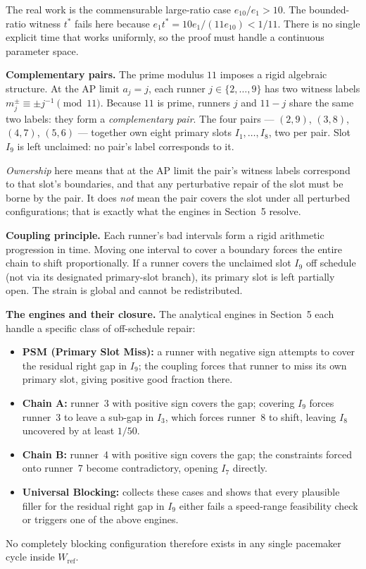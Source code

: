 \documentclass[12pt,a4paper]{amsart}
\theoremstyle{definition}
\theoremstyle{remark}
\newcommand{\Wref}{W_{\mathrm{ref}}}
\begin{document}
The real work is the commensurable large-ratio case $e_{10}/e_1>10$. The bounded-ratio
witness $t^*$ fails here because $e_1 t^*=10e_1/(11e_{10})<1/11$. There is no single
explicit time that works uniformly, so the proof must handle a continuous parameter space.

\medskip\noindent\textbf{Complementary pairs.}
The prime modulus $11$ imposes a rigid algebraic structure. At the AP limit $a_j=j$, each
runner $j\in\{2,\ldots,9\}$ has two witness labels $m_j^{\pm}\equiv\pm j^{-1}\pmod{11}$.
Because $11$ is prime, runners $j$ and $11-j$ share the same two labels: they form a
\emph{complementary pair}. The four pairs --- $(2,9)$, $(3,8)$, $(4,7)$, $(5,6)$ ---
together own eight primary slots $I_1,\ldots,I_8$, two per pair. Slot $I_9$ is left
unclaimed: no pair's label corresponds to it.

\emph{Ownership} here means that at the AP limit the pair's witness labels correspond to
that slot's boundaries, and that any perturbative repair of the slot must be borne by the
pair. It does \emph{not} mean the pair covers the slot under all perturbed configurations;
that is exactly what the engines in Section~5 resolve.

\medskip\noindent\textbf{Coupling principle.}
Each runner's bad intervals form a rigid arithmetic progression in time. Moving one
interval to cover a boundary forces the entire chain to shift proportionally. If a runner
covers the unclaimed slot $I_9$ off schedule (not via its designated primary-slot branch),
its primary slot is left partially open. The strain is global and cannot be redistributed.

\medskip\noindent\textbf{The engines and their closure.}
The analytical engines in Section~5 each handle a specific class of off-schedule repair:
\begin{itemize}
  \item \textbf{PSM (Primary Slot Miss):} a runner with negative sign attempts to cover
        the residual right gap in $I_9$; the coupling forces that runner to miss its own
        primary slot, giving positive good fraction there.
  \item \textbf{Chain A:} runner~3 with positive sign covers the gap; covering $I_9$
        forces runner~3 to leave a sub-gap in $I_3$, which forces runner~8 to shift,
        leaving $I_8$ uncovered by at least $1/50$.
  \item \textbf{Chain B:} runner~4 with positive sign covers the gap; the constraints
        forced onto runner~7 become contradictory, opening $I_7$ directly.
  \item \textbf{Universal Blocking:} collects these cases and shows that every plausible
        filler for the residual right gap in $I_9$ either fails a speed-range feasibility
        check or triggers one of the above engines.
\end{itemize}
No completely blocking configuration therefore exists in any single pacemaker cycle
inside $\Wref$.
\end{document}
